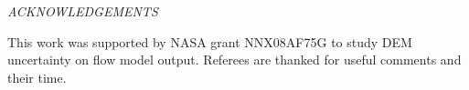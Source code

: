 \documentclass[a4paper,fleqn]{article}
\newcommand{\Pic}[2][0.85]{\begin{center}\texttt{[image: \#2]}
 \end{center} }
\begin{document}
\centerline{\it ACKNOWLEDGEMENTS}
This work was supported by NASA grant NNX08AF75G to study DEM
uncertainty on flow model output.  Referees are thanked for useful
comments and their time.




%
\end{document}
